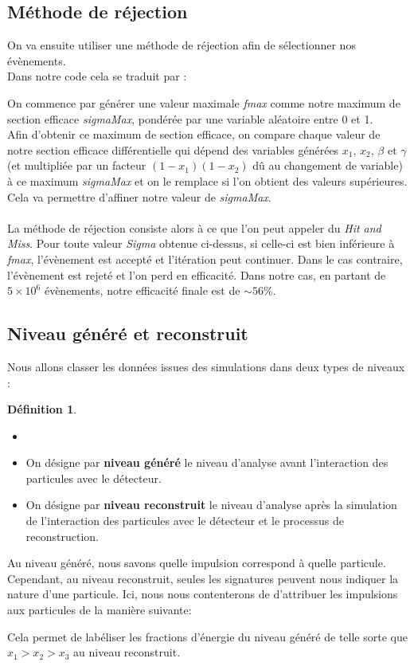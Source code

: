 \documentclass[a4paper]{article} %
\numberwithin{equation}{section} %
\theoremstyle{definition}
\newtheorem{definition}{Définition}[section]
\theoremstyle{remark}
\theoremstyle{plain}%
\theoremstyle{style_exemple}
\newenvironment{formal_def}{%
  \def\FrameCommand{%
    \hspace{0pt}%
    {\color{OliveGreen}\vrule width 2pt}%
    {\color{defshade}\vrule width 4pt}%
    \colorbox{defshade}%
  }%
  \MakeFramed{\advance\hsize-\width\FrameRestore}%
  \noindent\hspace{-4.55pt}%
  \begin{adjustwidth}{}{7pt}%
  \vspace{2pt}\vspace{2pt}%
}
{%
  \vspace{2pt}\end{adjustwidth}\endMakeFramed%
}
\newcommand{\coldef}[1]{\begin{formal_def}
    \begin{definition}
        #1
    \end{definition}
\end{formal_def}}
\newcommand{\g}[1]{\og #1 \fg{}} %
\begin{document}
\subsection{Méthode de réjection}
On va ensuite utiliser une méthode de réjection afin de sélectionner nos évènements.\\
Dans notre code cela se traduit par :

On commence par générer une valeur maximale \textit{fmax} comme notre maximum de section efficace \textit{sigmaMax}, pondérée par une variable aléatoire entre 0 et 1.\\

Afin d'obtenir ce maximum de section efficace, on compare chaque valeur de notre section efficace différentielle qui dépend des variables générées $x_1$, $x_2$, $\beta$ et $\gamma$ (et multipliée par un facteur $(1-x_1)(1-x_2)$ dû au changement de variable) à ce maximum \textit{sigmaMax} et on le remplace si l'on obtient des valeurs supérieures. Cela va permettre d'affiner notre valeur de \textit{sigmaMax}.\\
\\

La méthode de réjection consiste alors à ce que l'on peut appeler du \textit{Hit and Miss}. Pour toute valeur \textit{Sigma} obtenue ci-dessus, si celle-ci est bien inférieure à \textit{fmax}, l'évènement est accepté et l'itération peut continuer. Dans le cas contraire, l'évènement est rejeté et l'on perd en efficacité. Dans notre cas, en partant de $5\times 10^6$ évènements, notre efficacité finale est de $\sim56\%$.


\subsection{Niveau généré et reconstruit}
Nous allons classer les données issues des simulations dans deux types de \g{niveaux}:
\coldef{
\begin{itemize}
\item[] 
    \item On désigne par \g{\textbf{niveau généré}} le niveau d'analyse avant l'interaction des particules avec le détecteur.
    \item On désigne par \g{\textbf{niveau reconstruit}} le niveau d'analyse après la simulation de l'interaction des particules avec le détecteur et le processus de reconstruction.
\end{itemize}
}
Au niveau généré, nous savons quelle impulsion correspond à quelle particule. Cependant, au niveau reconstruit, seules les signatures peuvent nous indiquer la nature d'une particule. Ici, nous nous contenterons de d'attribuer les impulsions aux particules de la manière suivante:

Cela permet de labéliser les fractions d'énergie du niveau généré de telle sorte que \mbox{$x_1>x_2>x_3$} au niveau reconstruit.
\end{document}
